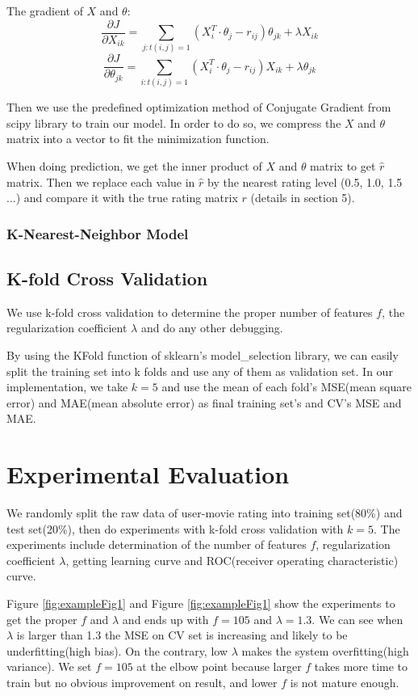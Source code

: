 \documentclass[12pt]{article}
\begin{document}
The gradient of $X$ and $\theta$:
$$\frac{\partial J}{\partial X_{ik}} = \sum_{j:t(i,j)=1}(X_i^T \cdot \theta_j - r_{ij})\theta_{jk}+\lambda X_{ik}$$
$$\frac{\partial J}{\partial \theta_{jk}} = \sum_{i:t(i,j)=1}(X_i^T \cdot \theta_j - r_{ij})X_{ik}+\lambda \theta_{jk}$$

Then we use the predefined optimization method of Conjugate Gradient from scipy library to train our model. In order to do so, we compress the $X$ and $\theta$ matrix into a vector to fit the minimization function.

When doing prediction, we get the inner product of $X$ and $\theta$ matrix to get $\hat{r}$ matrix. Then we replace each value in $\hat{r}$ by the nearest rating level (0.5, 1.0, 1.5 ...) and compare it with the true rating matrix $r$ (details in section 5).

\subsubsection{K-Nearest-Neighbor Model}

\subsection{K-fold Cross Validation}
We use k-fold cross validation to determine the proper number of features $f$, the regularization coefficient $\lambda$ and do any other debugging.

By using the KFold function of sklearn's model\_selection library, we can easily split the training set into k folds and use any of them as validation set. In our implementation, we take $k=5$ and use the mean of each fold's MSE(mean square error) and MAE(mean absolute error) as final training set's and CV's MSE and MAE.

\section{Experimental Evaluation}
We randomly split the raw data of user-movie rating into training set(80\%) and test set(20\%), then do experiments with k-fold cross validation with $k=5$.
The experiments include determination of the number of features $f$, regularization coefficient $\lambda$, getting learning curve and ROC(receiver operating characteristic) curve.

Figure \ref{fig:exampleFig1} and Figure \ref{fig:exampleFig1} show the  experiments to get the proper $f$ and $\lambda$ and ends up with $f=105$ and $\lambda = 1.3$. We can see when $\lambda$ is larger than 1.3 the MSE on CV set is increasing and likely to be underfitting(high bias). On the contrary, low $\lambda$ makes the system overfitting(high variance). We set $f=105$ at the elbow point because larger $f$ takes more time to train but no obvious improvement on result, and lower $f$ is not mature enough.
\end{document}
